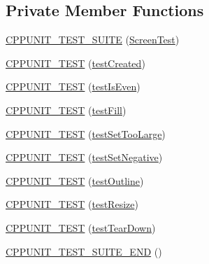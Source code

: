 \subsection*{Private Member Functions}
\begin{DoxyCompactItemize}
\item 
\hyperlink{classScreenTest_a2c73c19e06eac308fa08dd65e9c6395a}{C\-P\-P\-U\-N\-I\-T\-\_\-\-T\-E\-S\-T\-\_\-\-S\-U\-I\-T\-E} (\hyperlink{classScreenTest}{Screen\-Test})
\item 
\hyperlink{classScreenTest_a5728d64d6a8c557f8584965d0bc75ca3}{C\-P\-P\-U\-N\-I\-T\-\_\-\-T\-E\-S\-T} (\hyperlink{classScreenTest_a4595a99a5ebbf7ee134cd6538ecace67}{test\-Created})
\item 
\hyperlink{classScreenTest_a890783d5a9928222120f74e03f3328d7}{C\-P\-P\-U\-N\-I\-T\-\_\-\-T\-E\-S\-T} (\hyperlink{classScreenTest_aef35856d8988e05958ebcf3418e87665}{test\-Is\-Even})
\item 
\hyperlink{classScreenTest_a597fedc953bca7bb6c2d24dcdab6e0a5}{C\-P\-P\-U\-N\-I\-T\-\_\-\-T\-E\-S\-T} (\hyperlink{classScreenTest_af0851953b701a861a0362cdc798f7388}{test\-Fill})
\item 
\hyperlink{classScreenTest_ab6c548ccf926a15d8afa3a91d01f1cbe}{C\-P\-P\-U\-N\-I\-T\-\_\-\-T\-E\-S\-T} (\hyperlink{classScreenTest_a451b607eb14d10510479c7eda92c1d4e}{test\-Set\-Too\-Large})
\item 
\hyperlink{classScreenTest_aa883e0958f766c70d9efd1b55417faaa}{C\-P\-P\-U\-N\-I\-T\-\_\-\-T\-E\-S\-T} (\hyperlink{classScreenTest_af3360263706600fd57fe101fdf22be5d}{test\-Set\-Negative})
\item 
\hyperlink{classScreenTest_a4258bf095f5dc0355c2bd0ad7b5776ba}{C\-P\-P\-U\-N\-I\-T\-\_\-\-T\-E\-S\-T} (\hyperlink{classScreenTest_a20b2274b2fc94ec76fa67b84235ec328}{test\-Outline})
\item 
\hyperlink{classScreenTest_a2ab1249bb9451b6dc7113081c73bf01f}{C\-P\-P\-U\-N\-I\-T\-\_\-\-T\-E\-S\-T} (\hyperlink{classScreenTest_a44ced1845bd4e17e371a40f70202b3d5}{test\-Resize})
\item 
\hyperlink{classScreenTest_a0b5e970614a973cc46911008ea99e5ff}{C\-P\-P\-U\-N\-I\-T\-\_\-\-T\-E\-S\-T} (\hyperlink{classScreenTest_a307c0767825f1ce5e2beae8122ac28ff}{test\-Tear\-Down})
\item 
\hyperlink{classScreenTest_a5dbc6e7ad3d00da4f05831b9c7cbd169}{C\-P\-P\-U\-N\-I\-T\-\_\-\-T\-E\-S\-T\-\_\-\-S\-U\-I\-T\-E\-\_\-\-E\-N\-D} ()
\end{DoxyCompactItemize}
